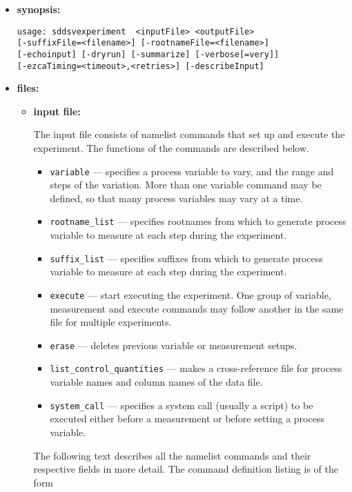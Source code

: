 \begin{itemize}
\item {\bf synopsis:} 
%
%
\begin{verbatim}
usage: sddsvexperiment  <inputFile> <outputFile>
[-suffixFile=<filename>] [-rootnameFile=<filename>]
[-echoinput] [-dryrun] [-summarize] [-verbose[=very]] 
[-ezcaTiming=<timeout>,<retries>] [-describeInput]
\end{verbatim}
\item {\bf files:}
\begin{itemize}
\item {\bf input file:}\par
The input file consists of namelist commands that set up and execute the experiment. The functions of the commands
are described below.
\begin{itemize}
   \item {\verb+variable+} --- specifies a process variable to vary,
      and the range and steps of the variation. More than one variable
      command may be defined, so that many process variables may vary
      at a time.

   \item {\verb+rootname_list+} --- specifies rootnames from which to
      generate process variable to measure at each step during the
      experiment.

   \item {\verb+suffix_list+} --- specifies suffixes from which to
      generate process variable to measure at each step during the
      experiment.

   \item {\verb+execute+} --- start executing the experiment. One
      group of variable, measurement and execute commands may follow
      another in the same file for multiple experiments.

   \item {\verb+erase+} --- deletes previous variable or measurement
      setups.

   \item {\verb+list_control_quantities+} --- makes a cross-reference
      file for process variable names and column names of the data
      file.

   \item {\verb+system_call+} --- specifies a system call (usually a
       script) to be executed either before a measurement or before
       setting a process variable.
\end{itemize}
The following text describes all the namelist commands and their
respective fields in more detail.  The command definition listing is
of the form


\end{itemize}
\end{itemize}
